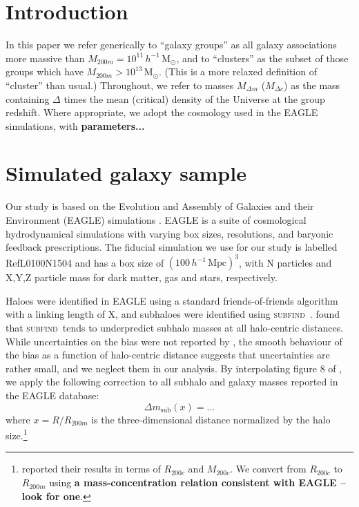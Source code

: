 \documentclass[usenatbib,fleqn]{mnras}
\newcommand{\Msun}{\mathrm{M}_\odot}
\newcommand{\hMsun}{h^{-1}\,\Msun}
\newcommand{\hMpc}{h^{-1}\,\mathrm{Mpc}}
\newcommand{\subfind}{\textsc{subfind}}
\begin{document}
\section{Introduction}

In this paper we refer generically to ``galaxy groups'' as all galaxy associations more massive than $M_{200m}=10^{11}\,\hMsun$, and to ``clusters'' as the subset of those groups which have $M_{200m}>10^{13}\,\Msun$. (This is a more relaxed definition of ``cluster'' than usual.) Throughout, we refer to masses $M_{\Delta m}$ ($M_{\Delta c}$) as the mass containing $\Delta$ times the mean (critical) density of the Universe at the group redshift. Where appropriate, we adopt the cosmology used in the EAGLE simulations,  with \textbf{parameters...}


\section{Simulated galaxy sample}

Our study is based on the Evolution and Assembly of Galaxies and their Environment (EAGLE) simulations \citep{schaye15,crain15}. EAGLE is a suite of cosmological hydrodynamical simulations with varying box sizes, resolutions, and baryonic feedback prescriptions. The fiducial simulation we use for our study is labelled RefL0100N1504 and has a box size of $(100\,\hMpc)^3$, with N particles and X,Y,Z particle mass for dark matter, gas and stars, respectively.

Haloes were identified in EAGLE using a standard friends-of-friends algorithm with a linking length of X, and subhaloes were identified using \subfind\ \citep{springel01_cluster}. \cite{knebe11} found that \subfind\ tends to underpredict subhalo masses at all halo-centric distances. While uncertainties on the bias were not reported by \cite{knebe11}, the smooth behaviour of the bias as a function of halo-centric distance suggests that uncertainties are rather small, and we neglect them in our analysis. By interpolating figure 8 of \cite{knebe11}, we apply the following correction to all subhalo and galaxy masses reported in the EAGLE database:
\begin{equation}\label{eq:subfind_correction}
  \Delta m_\mathrm{sub}(x) = ...
\end{equation}
where $x=R/R_{200m}$ is the three-dimensional distance normalized by the halo size.\footnote{\cite{knebe11} reported their results in terms of $R_{200c}$ and $M_{200c}$. We convert from $R_{200c}$ to $R_{200m}$ using \textbf{a mass-concentration relation consistent with EAGLE -- look for one}.}
\end{document}
